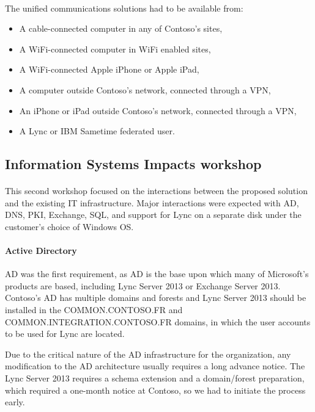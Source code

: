 	\paragraph{}
		The unified communications solutions had to be available from:
		\begin{itemize}
		\item A cable-connected computer in any of Contoso's sites,
		\item A WiFi-connected computer in WiFi enabled sites,
		\item A WiFi-connected Apple iPhone or Apple iPad,
		\item A computer outside Contoso's network, connected through a VPN,
		\item An iPhone or iPad outside Contoso's network, connected through a VPN,
		\item A Lync or IBM Sametime federated user.
		\end{itemize}


\subsection{Information Systems Impacts workshop}
	\paragraph{}
	This second workshop focused on the interactions between the proposed solution and the existing IT infrastructure. Major interactions were expected with AD, DNS, PKI, Exchange, SQL, and support for Lync on a separate disk under the customer's choice of Windows OS.

	\paragraph{Active Directory}
	AD was the first requirement, as AD is the base upon which many of Microsoft's products are based, including Lync Server 2013 or Exchange Server 2013. 
	Contoso's AD has multiple domains and forests and Lync Server 2013 should be installed in the COMMON.CONTOSO.FR and \linebreak COMMON.INTEGRATION.CONTOSO.FR domains, in which the user accounts to be used for Lync are located.

	Due to the critical nature of the AD infrastructure for the organization, any modification to the AD architecture usually requires a long advance notice. The Lync Server 2013 requires a schema extension and a domain/forest preparation, which required a one-month notice at Contoso, so we had to initiate the process early.


